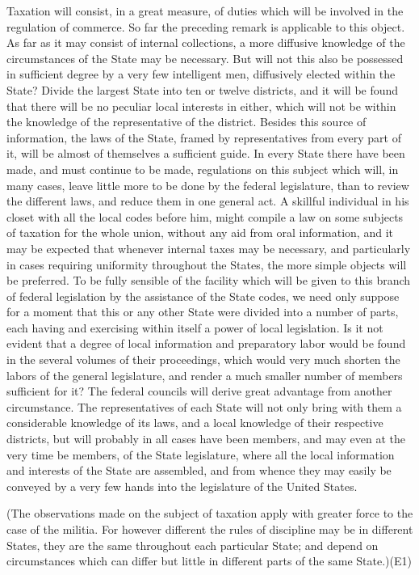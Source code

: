 Taxation will consist, in a great measure, of duties which will be involved in the regulation of commerce. So far the preceding remark is applicable to this object. As far as it may consist of internal collections, a more diffusive knowledge of the circumstances of the State may be necessary. But will not this also be possessed in sufficient degree by a very few intelligent men, diffusively elected within the State? Divide the largest State into ten or twelve districts, and it will be found that there will be no peculiar local interests in either, which will not be within the knowledge of the representative of the district. Besides this source of information, the laws of the State, framed by representatives from every part of it, will be almost of themselves a sufficient guide. In every State there have been made, and must continue to be made, regulations on this subject which will, in many cases, leave little more to be done by the federal legislature, than to review the different laws, and reduce them in one general act. A skillful individual in his closet with all the local codes before him, might compile a law on some subjects of taxation for the whole union, without any aid from oral information, and it may be expected that whenever internal taxes may be necessary, and particularly in cases requiring uniformity throughout the States, the more simple objects will be preferred. To be fully sensible of the facility which will be given to this branch of federal legislation by the assistance of the State codes, we need only suppose for a moment that this or any other State were divided into a number of parts, each having and exercising within itself a power of local legislation. Is it not evident that a degree of local information and preparatory labor would be found in the several volumes of their proceedings, which would very much shorten the labors of the general legislature, and render a much smaller number of members sufficient for it? The federal councils will derive great advantage from another circumstance. The representatives of each State will not only bring with them a considerable knowledge of its laws, and a local knowledge of their respective districts, but will probably in all cases have been members, and may even at the very time be members, of the State legislature, where all the local information and interests of the State are assembled, and from whence they may easily be conveyed by a very few hands into the legislature of the United States.

(The observations made on the subject of taxation apply with greater force to the case of the militia. For however different the rules of discipline may be in different States, they are the same throughout each particular State; and depend on circumstances which can differ but little in different parts of the same State.)(E1)

